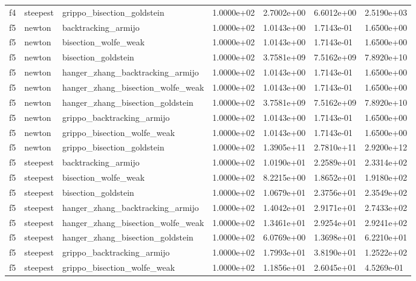 \documentclass[a4paper,11pt]{article}
\numberwithin{equation}{section} %
\begin{document}
\begin{longtable}{p{1.5cm}|p{1.5cm}|p{4cm}|p{2cm}|p{2cm}|p{2cm}|p{2cm}}
        f4 & steepest & grippo\_bisection\_goldstein & 1.0000e+02 & 2.7002e+00 & 6.6012e+00 & 2.5190e+03 \\
        f5 & newton & backtracking\_armijo & 1.0000e+02 & 1.0143e+00 & 1.7143e-01 & 1.6500e+00 \\
        f5 & newton & bisection\_wolfe\_weak & 1.0000e+02 & 1.0143e+00 & 1.7143e-01 & 1.6500e+00 \\
        f5 & newton & bisection\_goldstein & 1.0000e+02 & 3.7581e+09 & 7.5162e+09 & 7.8920e+10 \\
        f5 & newton & hanger\_zhang\_backtracking\_armijo & 1.0000e+02 & 1.0143e+00 & 1.7143e-01 & 1.6500e+00 \\
        f5 & newton & hanger\_zhang\_bisection\_wolfe\_weak & 1.0000e+02 & 1.0143e+00 & 1.7143e-01 & 1.6500e+00 \\
        f5 & newton & hanger\_zhang\_bisection\_goldstein & 1.0000e+02 & 3.7581e+09 & 7.5162e+09 & 7.8920e+10 \\
        f5 & newton & grippo\_backtracking\_armijo & 1.0000e+02 & 1.0143e+00 & 1.7143e-01 & 1.6500e+00 \\
        f5 & newton & grippo\_bisection\_wolfe\_weak & 1.0000e+02 & 1.0143e+00 & 1.7143e-01 & 1.6500e+00 \\
        f5 & newton & grippo\_bisection\_goldstein & 1.0000e+02 & 1.3905e+11 & 2.7810e+11 & 2.9200e+12 \\
        f5 & steepest & backtracking\_armijo & 1.0000e+02 & 1.0190e+01 & 2.2589e+01 & 2.3314e+02 \\
        f5 & steepest & bisection\_wolfe\_weak & 1.0000e+02 & 8.2215e+00 & 1.8652e+01 & 1.9180e+02 \\
        f5 & steepest & bisection\_goldstein & 1.0000e+02 & 1.0679e+01 & 2.3756e+01 & 2.3549e+02 \\
        f5 & steepest & hanger\_zhang\_backtracking\_armijo & 1.0000e+02 & 1.4042e+01 & 2.9171e+01 & 2.7433e+02 \\
        f5 & steepest & hanger\_zhang\_bisection\_wolfe\_weak & 1.0000e+02 & 1.3461e+01 & 2.9254e+01 & 2.9241e+02 \\
        f5 & steepest & hanger\_zhang\_bisection\_goldstein & 1.0000e+02 & 6.0769e+00 & 1.3698e+01 & 6.2210e+01 \\
        f5 & steepest & grippo\_backtracking\_armijo & 1.0000e+02 & 1.7993e+01 & 3.8190e+01 & 1.2522e+02 \\
        f5 & steepest & grippo\_bisection\_wolfe\_weak & 1.0000e+02 & 1.1856e+01 & 2.6045e+01 & 4.5269e-01 \\

\end{longtable}
\end{document}
